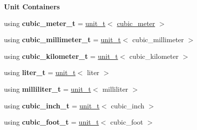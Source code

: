 \begin{Indent}{\bf Unit Containers}\par
{\em \label{namespaceunits_1_1volume_volumeContainers}%
\hypertarget{namespaceunits_1_1volume_volumeContainers}{}%
}\begin{DoxyCompactItemize}
\item 
\hypertarget{namespaceunits_1_1volume_a25c536ad8b761521a4f0f3cffe333287}{}using {\bfseries cubic\+\_\+meter\+\_\+t} = \hyperlink{classunits_1_1unit__t}{unit\+\_\+t}$<$ \hyperlink{structunits_1_1unit}{cubic\+\_\+meter} $>$\label{namespaceunits_1_1volume_a25c536ad8b761521a4f0f3cffe333287}

\item 
\hypertarget{namespaceunits_1_1volume_a3b82aeebb47a506d77c85cf3dcc7357f}{}using {\bfseries cubic\+\_\+millimeter\+\_\+t} = \hyperlink{classunits_1_1unit__t}{unit\+\_\+t}$<$ cubic\+\_\+millimeter $>$\label{namespaceunits_1_1volume_a3b82aeebb47a506d77c85cf3dcc7357f}

\item 
\hypertarget{namespaceunits_1_1volume_a3e50a874d07c44e88b41eeea13d2f0e7}{}using {\bfseries cubic\+\_\+kilometer\+\_\+t} = \hyperlink{classunits_1_1unit__t}{unit\+\_\+t}$<$ cubic\+\_\+kilometer $>$\label{namespaceunits_1_1volume_a3e50a874d07c44e88b41eeea13d2f0e7}

\item 
\hypertarget{namespaceunits_1_1volume_aaca29587481711b81c3e0765f22187a5}{}using {\bfseries liter\+\_\+t} = \hyperlink{classunits_1_1unit__t}{unit\+\_\+t}$<$ liter $>$\label{namespaceunits_1_1volume_aaca29587481711b81c3e0765f22187a5}

\item 
\hypertarget{namespaceunits_1_1volume_ae811b16bcdefa5a242659519c4d4e492}{}using {\bfseries milliliter\+\_\+t} = \hyperlink{classunits_1_1unit__t}{unit\+\_\+t}$<$ milliliter $>$\label{namespaceunits_1_1volume_ae811b16bcdefa5a242659519c4d4e492}

\item 
\hypertarget{namespaceunits_1_1volume_a57e957ee9c07ce8dbdc6dc13d0a83170}{}using {\bfseries cubic\+\_\+inch\+\_\+t} = \hyperlink{classunits_1_1unit__t}{unit\+\_\+t}$<$ cubic\+\_\+inch $>$\label{namespaceunits_1_1volume_a57e957ee9c07ce8dbdc6dc13d0a83170}

\item 
\hypertarget{namespaceunits_1_1volume_aae5fa2d5e34b1c63874032dae370526b}{}using {\bfseries cubic\+\_\+foot\+\_\+t} = \hyperlink{classunits_1_1unit__t}{unit\+\_\+t}$<$ cubic\+\_\+foot $>$\label{namespaceunits_1_1volume_aae5fa2d5e34b1c63874032dae370526b}


\end{DoxyCompactItemize}
\end{Indent}
